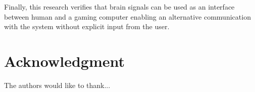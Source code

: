 \documentclass[journal]{IEEEtran}
\begin{document}
{{Finally, this research verifies that brain signals can be used as an interface between human and a gaming computer enabling an alternative communication with the system without explicit input from the user.




%

\section*{Acknowledgment}


The authors would like to thank...


\ifCLASSOPTIONcaptionsoff
  \newpage
\fi





}}
\end{document}
